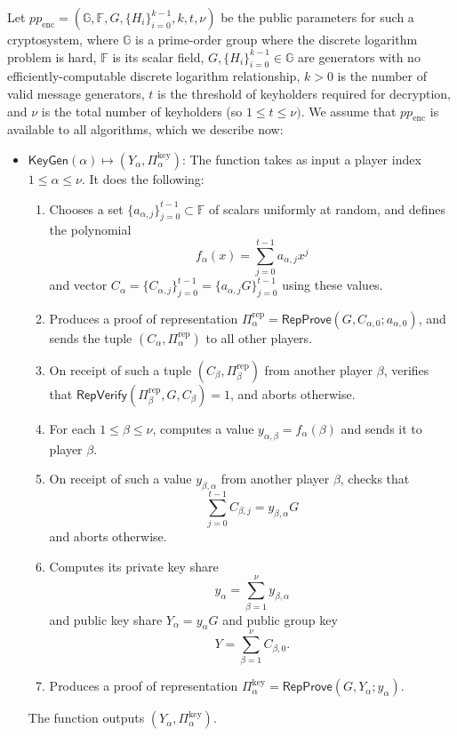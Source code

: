 \documentclass{article}
\newcommand{\G}{\mathbb{G}}
\newcommand{\F}{\mathbb{F}}
\newcommand{\func}[1]{\mathsf{#1}}
\begin{document}
Let $pp_{\text{enc}} = (\G, \F, G, \{H_i\}_{i=0}^{k-1}, k, t, \nu)$ be the public parameters for such a cryptosystem, where $\G$ is a prime-order group where the discrete logarithm problem is hard, $\F$ is its scalar field, $G, \{H_i\}_{i=0}^{k-1} \in \G$ are generators with no efficiently-computable discrete logarithm relationship, $k > 0$ is the number of valid message generators, $t$ is the threshold of keyholders required for decryption, and $\nu$ is the total number of keyholders (so $1 \leq t \leq \nu)$.
We assume that $pp_{\text{enc}}$ is available to all algorithms, which we describe now:
\begin{itemize}
    \item $\func{KeyGen}(\alpha) \mapsto (Y_\alpha, \Pi_\alpha^{\text{key}})$: The function takes as input a player index $1 \leq \alpha \leq \nu$.
    It does the following:
    \begin{enumerate}
        \item Chooses a set $\{a_{\alpha,j}\}_{j=0}^{t-1} \subset \F$ of scalars uniformly at random, and defines the polynomial $$f_\alpha(x) = \sum_{j=0}^{t-1} a_{\alpha,j}x^j$$ and vector $C_\alpha = \{C_{\alpha,j}\}_{j=0}^{t-1} = \{a_{\alpha,j}G\}_{j=0}^{t-1}$ using these values.
        \item Produces a proof of representation $\Pi_\alpha^{\text{rep}} = \func{RepProve}(G, C_{\alpha,0} ; a_{\alpha,0})$, and sends the tuple $(C_\alpha, \Pi_\alpha^{\text{rep}})$ to all other players.
        \item On receipt of such a tuple $(C_\beta, \Pi_\beta^{\text{rep}})$ from another player $\beta$, verifies that $\func{RepVerify}(\Pi_\beta^{\text{rep}}, G, C_\beta) = 1$, and aborts otherwise.
        \item For each $1 \leq \beta \leq \nu$, computes a value $y_{\alpha, \beta} = f_\alpha(\beta)$ and sends it to player $\beta$.
        \item On receipt of such a value $y_{\beta,\alpha}$ from another player $\beta$, checks that $$\sum_{j=0}^{t-1} C_{\beta,j} = y_{\beta,\alpha}G$$ and aborts otherwise.
        \item Computes its private key share $$y_\alpha = \sum_{\beta=1}^{\nu} y_{\beta,\alpha}$$ and public key share $Y_\alpha = y_\alpha G$ and public group key $$Y = \sum_{\beta=1}^{\nu} C_{\beta,0}.$$
        \item Produces a proof of representation $\Pi_\alpha^{\text{key}} = \func{RepProve}(G, Y_\alpha ; y_\alpha)$.
    \end{enumerate}
    The function outputs $(Y_\alpha, \Pi_\alpha^{\text{key}})$.
    

\end{itemize}
\end{document}
